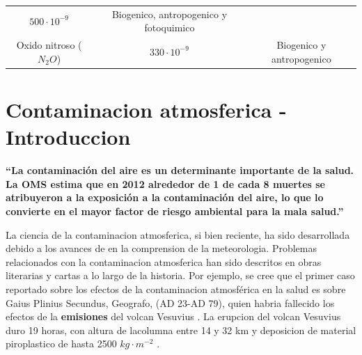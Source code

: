 \documentclass[]{book}
\begin{document}
\begin{longtable}[]{@{}ccc@{}}
\begin{minipage}[t]{0.48\columnwidth}
\(500 \cdot10^{-9}\)\strut
\end{minipage} & \begin{minipage}[t]{0.28\columnwidth}\centering
Biogenico, antropogenico y fotoquimico\strut
\end{minipage}\tabularnewline
\begin{minipage}[t]{0.15\columnwidth}\centering
Oxido nitroso (\(N_2O\))\strut
\end{minipage} & \begin{minipage}[t]{0.48\columnwidth}\centering
\(330 \cdot10^{-9}\)\strut
\end{minipage} & \begin{minipage}[t]{0.28\columnwidth}\centering
Biogenico y antropogenico\strut
\end{minipage}\tabularnewline
\bottomrule
\end{longtable}

\hypertarget{contaminacion-atmosferica---introduccion}{%
\section{Contaminacion atmosferica - Introduccion}\label{contaminacion-atmosferica---introduccion}}

\textbf{``La contaminación del aire es un determinante importante de la salud. La OMS estima que en 2012 alrededor de 1 de cada 8 muertes se atribuyeron a la exposición a la contaminación del aire, lo que lo convierte en el mayor factor de riesgo ambiental para la mala salud.''}\citep{oms}

La ciencia de la contaminacion atmosferica, si bien reciente, ha sido desarrollada debido a los avances de en la comprension de la meteorologia. Problemas relacionados con la contaminacion atmosferica han sido descritos en obras literarias y cartas a lo largo de la historia. Por ejemplo, se cree que el primer caso reportado sobre los efectos de la contaminacion atmosférica en la salud es sobre Gaius Plinius Secundus, Geografo, (AD 23-AD 79), quien habria fallecido los efectos de la \textbf{emisiones} del volcan Vesuvius \citep{art, vis}. La erupcion del volcan Vesuvius duro 19 horas, con altura de lacolumna entre 14 y 32 km y deposicion de material piroplastico de hasta 2500 \(kg \cdot m^{-2}\) \citep{macedonio1988numerical}.
\end{document}
